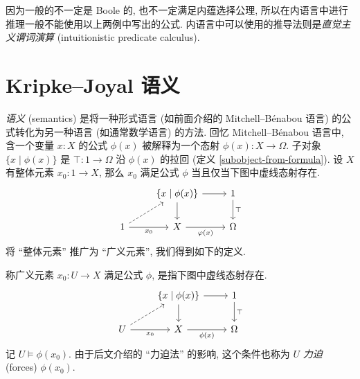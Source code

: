 因为一般的\topos{}不一定是 Boole 的, 也不一定满足内蕴选择公理, 所以在内语言中进行推理一般不能使用以上两例中写出的公式.
内语言中可以使用的推导法则是\emph{直觉主义谓词演算} (intuitionistic predicate calculus).



\label{logical-functor-internal}

\section{Kripke--Joyal 语义}

\emph{语义} (semantics) 是将一种形式语言 (如前面介绍的 Mitchell--B\'enabou 语言) 的公式转化为另一种语言 (如通常数学语言) 的方法. 回忆 Mitchell--B\'enabou 语言中, 含一个变量 $x\colon X$ 的公式 $\phi(x)$ 被解释为一个态射 $\phi(x) \colon X \to \Omega$.
子对象 $\{x \mid \phi(x)\}$ 是 $\top\colon 1\to\Omega$ 沿 $\phi(x)$ 的拉回 (定义 \ref{subobject-from-formula}).
设 $X$ 有整体元素 $x_0\colon 1\to X$, 那么 $x_0$ 满足公式 $\phi$ 当且仅当下图中虚线态射存在.
\[\begin{tikzcd}[ampersand replacement=\&]
	\& {\{x\mid\phi(x)\}} \& 1 \\
	1 \& X \& \Omega
	\arrow[from=1-2, to=2-2]
	\arrow["{x_0}"', from=2-1, to=2-2]
	\arrow["{\varphi(x)}"', from=2-2, to=2-3]
	\arrow[dashed, from=2-1, to=1-2]
	\arrow[from=1-2, to=1-3]
	\arrow["\top", from=1-3, to=2-3]
\end{tikzcd}\]
将 ``整体元素'' 推广为 ``广义元素'', 我们得到如下的定义.

\newcommand{\forces}{\models}

\begin{definition}
	{}
	称广义元素 $x_0 \colon U\to X$ 满足公式 $\phi$, 是指下图中虚线态射存在.
	\[\begin{tikzcd}[ampersand replacement=\&]
		\& {\{x\mid\phi(x)\}} \& 1 \\
		U \& X \& \Omega
		\arrow[from=1-2, to=2-2]
		\arrow["{x_0}"', from=2-1, to=2-2]
		\arrow["{\phi(x)}"', from=2-2, to=2-3]
		\arrow[dashed, from=2-1, to=1-2]
		\arrow[from=1-2, to=1-3]
		\arrow["\top", from=1-3, to=2-3]
	\end{tikzcd}\]
	记 $U\forces \phi(x_0)$. 由于后文介绍的 ``力迫法'' 的影响, 这个条件也称为 $U$ \emph{力迫} (forces) $\phi(x_0)$.
\end{definition}

